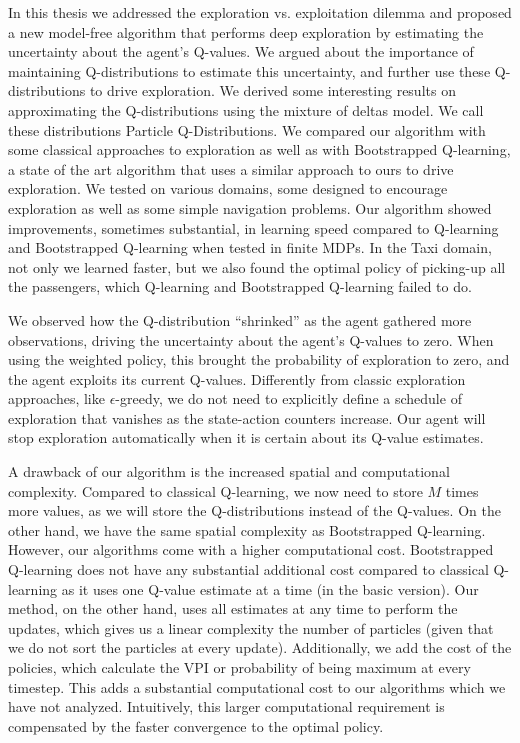 In this thesis we addressed the exploration vs. exploitation dilemma and proposed a new model-free algorithm that performs deep exploration by estimating the uncertainty about the agent's Q-values. We argued about the importance of maintaining Q-distributions to estimate this uncertainty, and further use these Q-distributions to drive exploration. We derived some interesting results on approximating the Q-distributions using the mixture of deltas model. We call these distributions Particle Q-Distributions. We compared our algorithm with some classical approaches to exploration as well as with Bootstrapped Q-learning, a state of the art algorithm that uses a similar approach to ours to drive exploration. We tested on various domains, some designed to encourage exploration as well as some simple navigation problems. Our algorithm showed improvements, sometimes substantial, in learning speed compared to Q-learning and Bootstrapped Q-learning when tested in finite MDPs. In the Taxi domain, not only we learned faster, but we also found the optimal policy of picking-up all the passengers, which Q-learning and Bootstrapped Q-learning failed to do.\par
We observed how the Q-distribution ``shrinked'' as the agent gathered more observations, driving the uncertainty about the agent's Q-values to zero. When using the weighted policy, this brought the probability of exploration to zero, and the agent exploits its current Q-values. Differently from classic exploration approaches, like $\epsilon$-greedy, we do not need to explicitly define a schedule of exploration that vanishes as the state-action counters increase. Our agent will stop exploration automatically when it is certain about its Q-value estimates.\par
A drawback of our algorithm is the increased spatial and computational complexity. Compared to classical Q-learning, we now need to store $M$ times more values, as we will store the Q-distributions instead of the Q-values. On the other hand, we have the same spatial complexity as Bootstrapped Q-learning. However, our algorithms come with a higher computational cost. Bootstrapped Q-learning does not have any substantial additional cost compared to classical Q-learning as it uses one Q-value estimate at a time (in the basic version). Our method, on the other hand, uses all estimates at any time to perform the updates, which gives us a linear complexity \wrt the number of particles (given that we do not sort the particles at every update). Additionally, we add the cost of the policies, which calculate the VPI or probability of being maximum at every timestep. This adds a substantial computational cost to our algorithms which we have not analyzed. Intuitively, this larger computational requirement is compensated by the faster convergence to the optimal policy.\par 
